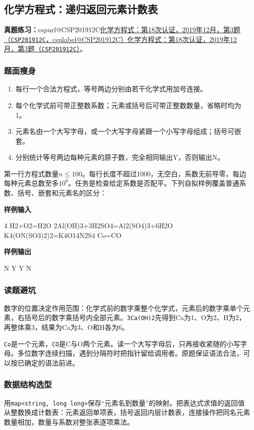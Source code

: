 \documentclass[UTF8,11pt,a4paper,fontset=none]{ctexart}
\makeatletter
\newcommand{\csp}[2]{\ifcsname cspurl@#1\endcsname\href{\csname cspurl@#1\endcsname}{#2（\texttt{#1}，\csname csplabel@#1\endcsname）}\else\href{https://oj.shumeng.tech/p/#1}{#2（\texttt{#1}）}\fi}
\newcommand{\ojpractice}[2]{\par\noindent\textbf{真题练习：}\csp{#1}{#2}。\par}
\makeatother
\begin{document}
\subsection{化学方程式：递归返回元素计数表}
\ojpractice{CSP201912C}{化学方程式：第18次认证，2019年12月，第3题}
\subsubsection{题面瘦身}
\begin{enumerate}
\item 每行一个合法方程式，等号两边分别由若干化学式用加号连接。
\item 每个化学式前可带正整数系数；元素或括号后可带正整数数量，省略时均为1。
\item 元素名由一个大写字母，或一个大写字母紧跟一个小写字母组成；括号可嵌套。
\item 分别统计等号两边每种元素的原子数，完全相同输出Y，否则输出N。
\end{enumerate}
第一行方程式数量$n\le100$。每行长度不超过1000，无空白，系数无前导零，每边每种元素总数至多$10^9$。任务是检查给定系数是否配平。下列自拟样例覆盖普通系数、括号、嵌套和元素名的区分：
\begin{tcolorbox}[samplebox,title={输入输出样例}]
\textbf{样例输入}
\begin{Sample}
4
H2+O2=H2O
2Al(OH)3+3H2SO4=Al2(SO4)3+6H2O
K4(ON(SO3)2)2=K4O14N2S4
Co=CO
\end{Sample}
\tcblower
\textbf{样例输出}
\begin{Sample}
N
Y
Y
N
\end{Sample}
\end{tcolorbox}

\subsubsection{读题避坑}
数字的位置决定作用范围：化学式前的数字乘整个化学式，元素后的数字乘单个元素，右括号后的数字乘括号内全部元素。\texttt{3Ca(OH)2}先得到Ca为1、O为2、H为2，再整体乘3，结果为Ca为3、O和H各为6。

\texttt{Co}是一个元素，\texttt{CO}是C与O两个元素。读一个大写字母后，只再接收紧随的小写字母。多位数字连续扫描，遇到分隔符时把指针留给调用者。原题保证语法合法，可以按已确定的语法前进。

\subsubsection{数据结构选型}
用\texttt{map<string, long long>}保存“元素名到数量”的映射。把表达式求值的返回值从整数换成计数表：元素返回单项表，括号返回内层计数表，连接操作把同名元素数量相加，数量与系数对整张表逐项乘法。
\end{document}
